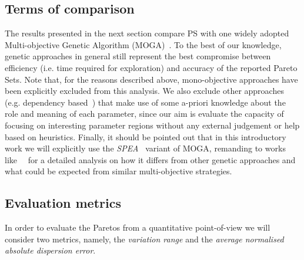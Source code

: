 \begin{table}
\end{table}
\subsection{Terms of comparison}

The results presented in the next section compare PS with one widely
adopted Multi-objective Genetic Algorithm
(MOGA)~\cite{knowles_techrep06}. To the best of our knowledge, genetic
approaches in general still represent the best compromise between
efficiency (i.e. time required for exploration) and accuracy of the
reported Pareto Sets.  Note that, for the reasons described above,
mono-objective approaches have been explicitly excluded from this
analysis.  We also exclude other approaches (e.g.  dependency
based~\cite{givargis_tvlsi02}) that make use of some a-priori
knowledge about the role and meaning of each parameter, since our aim
is evaluate the capacity of focusing on interesting parameter regions
without any external judgement or help based on heuristics.  Finally,
it should be pointed out that in this introductory work we will
explicitly use the \emph{SPEA}~\cite{zitzler_eurogen01} variant of
MOGA, remanding to works like~\cite{zitzler_ec00}~\cite{zitzler_tec03}
for a detailed analysis on how it differs from other genetic approaches
and what could be expected from similar multi-objective strategies.


\subsection{Evaluation metrics}
In order to evaluate the Paretos from a quantitative point-of-view we
will consider two metrics, namely, the \emph{variation range} and the
\emph{average normalised absolute dispersion error}. 

